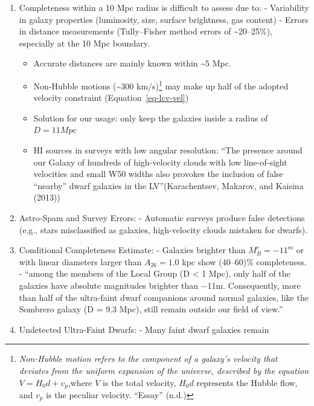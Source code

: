 \documentclass[
]{article}
\providecommand{\tightlist}{%
  \setlength{\itemsep}{0pt}\setlength{\parskip}{0pt}}\usepackage{longtable,booktabs,array}
\begin{document}
\begin{enumerate}
\def\labelenumi{\arabic{enumi}.}
\tightlist
\item
  Completeness within a 10 Mpc radius is difficult to assess due to: -
  Variability in galaxy properties (luminosity, size, surface
  brightness, gas content) - Errors in distance measurements
  (Tully--Fisher method errors of \textasciitilde20--25\%), especially
  at the 10 Mpc boundary.

  \begin{itemize}
  \tightlist
  \item
    Accurate distances are mainly known within \textasciitilde5 Mpc.
  \item
    Non-Hubble motions (\textasciitilde300 km/s)\footnote{\emph{Non-Hubble
      motion refers to the component of a galaxy's velocity that
      deviates from the uniform expansion of the universe, described by
      the equation} \(V= H_0 d + v_p\),where \(V\) is the total
      velocity, \(H_0 d\) represents the Hubble flow, and
      \(v_p\)\hspace{0pt} is the peculiar velocity. {``Essay''} (n.d.)}
    may make up half of the adopted velocity constraint
    (Equation~\ref{eq-lcv-vel})
  \item
    Solution for our usage: only keep the galaxies inside a radius of
    \(D=11 Mpc\)
  \item
    HI sources in surveys with low angular resolution: ``The presence
    around our Galaxy of hundreds of high-velocity clouds with low
    line-of-sight velocities and small W50 widths also provokes the
    inclusion of false ``nearby'' dwarf galaxies in the
    LV''(Karachentsev, Makarov, and Kaisina (2013))
  \end{itemize}
\item
  Astro-Spam and Survey Errors: - Automatic surveys produce false
  detections (e.g., stars misclassified as galaxies, high-velocity
  clouds mistaken for dwarfs).
\item
  Conditional Completeness Estimate: - Galaxies brighter than
  \(M_B^c = -11^m\) or with linear diameters larger than
  \(A_{26} = 1.0\) kpc show (40--60)\% completeness. - ``among the
  members of the Local Group (D \textless{} 1 Mpc), only half of the
  galaxies have absolute magnitudes brighter than −11m. Consequently,
  more than half of the ultra-faint dwarf companions around normal
  galaxies, like the Sombrero galaxy (D = 9.3 Mpc), still remain outside
  our field of view.''
\item
  Undetected Ultra-Faint Dwarfs: - Many faint dwarf galaxies remain

\end{enumerate}
\end{document}
